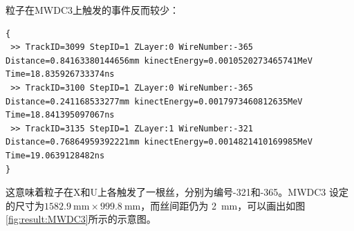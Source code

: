 \documentclass[bachelor,openany,oneside,color]{buaathesis}
\begin{document}
%
%
粒子在MWDC3上触发的事件反而较少：

\begin{lstlisting}[caption={MWDC3},firstnumber=4213,lastline=4215]
{
 >> TrackID=3099 StepID=1 ZLayer:0 WireNumber:-365 Distance=0.84163380144656mm kinectEnergy=0.0010520273465741MeV Time=18.835926733374ns
 >> TrackID=3100 StepID=1 ZLayer:0 WireNumber:-365 Distance=0.241168533277mm kinectEnergy=0.0017973460812635MeV Time=18.841395097067ns
 >> TrackID=3135 StepID=1 ZLayer:1 WireNumber:-321 Distance=0.76864959392221mm kinectEnergy=0.0014821410169985MeV Time=19.0639128482ns
}
\end{lstlisting}

这意味着粒子在X和U上各触发了一根丝，分别为编号-321和-365。MWDC3
设定的尺寸为$\SI{1582.9}{\milli\meter}\times\SI{999.8}{\milli\meter}$，而丝间距仍为
\SI{2}{\milli\meter}，可以画出如图\ref{fig:result:MWDC3}所示的示意图。
\end{document}

